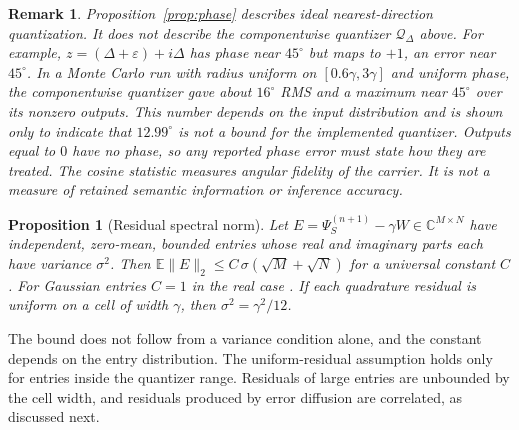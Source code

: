 \documentclass[10pt, twocolumn, a4paper]{article}
\newtheorem{proposition}{Proposition}
\newtheorem{remark}{Remark}
\begin{document}
\begin{remark}
Proposition~\ref{prop:phase} describes ideal nearest-direction quantization. It does not describe the componentwise quantizer $\mathcal{Q}_\Delta$ above. For example, $z=(\Delta+\varepsilon)+i\Delta$ has phase near $45^\circ$ but maps to $+1$, an error near $45^\circ$. In a Monte Carlo run with radius uniform on $[0.6\gamma,3\gamma]$ and uniform phase, the componentwise quantizer gave about $16^\circ$ RMS and a maximum near $45^\circ$ over its nonzero outputs. This number depends on the input distribution and is shown only to indicate that $12.99^\circ$ is not a bound for the implemented quantizer. Outputs equal to $0$ have no phase, so any reported phase error must state how they are treated. The cosine statistic measures angular fidelity of the carrier. It is not a measure of retained semantic information or inference accuracy.
\end{remark}

\begin{proposition}[Residual spectral norm]
Let $E=\Psi_S^{(n+1)}-\gamma W\in\mathbb{C}^{M\times N}$ have independent, zero-mean, bounded entries whose real and imaginary parts each have variance $\sigma^2$. Then $\mathbb{E}\|E\|_2\le C\,\sigma(\sqrt{M}+\sqrt{N})$ for a universal constant $C$ \cite{latala2005, bandeira2016}. For Gaussian entries $C=1$ in the real case \cite{bandeira2016}. If each quadrature residual is uniform on a cell of width $\gamma$, then $\sigma^2=\gamma^2/12$.
\end{proposition}
The bound does not follow from a variance condition alone, and the constant depends on the entry distribution. The uniform-residual assumption holds only for entries inside the quantizer range. Residuals of large entries are unbounded by the cell width, and residuals produced by error diffusion are correlated, as discussed next.
\end{document}
